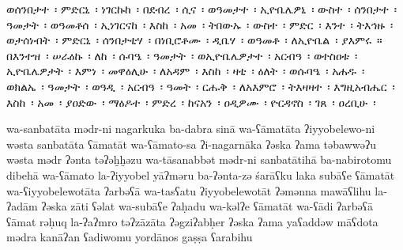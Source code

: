 
\begin{ethiopictext}
    ወሰንበታተ~፡ ምድርኒ~፡ ነገርኩከ~፡ በደብረ~፡ ሲና~፡ ወዓመታተ~፡
    ኢዮቤሌዎኒ~፡ ውስተ~፡ ሰንበታተ~፡ ዓመታት~፡ ወዓመቶሰ~፡ ኢነገርናከ~፡
    እስከ~፡ አመ~፡ ትበውኡ~፡ ውስተ~፡ ምድር~፡ እንተ~፡ ትእኅዙ~፡
    ወታሰነብት~፡ ምድርኒ~፡ ሰንበታቲሃ~፡ በነቢሮቶሙ~፡ ዲቤሃ~፡ 
    ወዓመቶ~፡ ለኢዮቤል~፡ ያእምሩ~። 
    በእንተዝ~፡ ሠራዕኩ~፡ ለከ~፡ 
    ሱባዔ~፡ ዓመታት~፡ ወኢዮቤሌዎታተ~፡ አርብዓ~፡ ወተስዐቱ~፡ ኢዮቤሌዎታት~፡
    እምነ~፡ መዋዕሊሁ~፡ ለአዳም~፡ እስከ~፡ ዛቲ~፡ ዕለት~፡ ወሱባዔ~፡
    አሐዱ~፡ ወክልኤ~፡ ዓመታት~፡ ወዓዲ~፡ አርብዓ~፡ ዓመት~፡ 
    ርሑቅ~፡ ለአእምሮ~፡ ትእዛዛተ~፡ እግዚአብሔር~፡ እስከ~፡ አመ~፡ ያዐድው~፡
    ማዕዶተ~፡ ምድረ~፡ ከናአን~፡ ዐዲዎሙ~፡ ዮርዳኖስ~፡ ገጸ~፡ ዐረቢሁ~፡
\end{ethiopictext}
\begin{transliteration}
    wa-sanbatāta mədr-ni nagarkuka ba-dabra sinā wa-ʕāmatāta
    ʔiyyobelewo-ni wəsta sanbatāta ʕāmatāt wa-ʕāmato-sa ʔi-nagarnāka
    ʔəska ʔama təbawwəʔu wəsta mədr ʔənta təʔəḫḫəzu
    wa-tāsanabbət mədr-ni sanbatātihā ba-nabirotomu dibehā
    wa-ʕāmato la-ʔiyyobel yāʔməru
    ba-ʔənta-zə śarāʕku laka
    subāʕe ʕāmatāt wa-ʕiyyobelewotāta ʔarbəʕā wa-tasʕatu ʔiyyobelewotāt
    ʔəmənna mawāʕlihu la-ʔadām ʔəska zāti ʕəlat wa-subāʕe
    ʔaḥadu wa-kəlʔe ʕāmatāt wa-ʕādi ʔarbəʕā ʕāmat
    rəḥuq la-ʔaʔmro təʔzāzāta ʔəgziʔabḥer ʔəska ʔama yaʕaddəw
    māʕdota mədra kanāʔan ʕadiwomu yordānos gaṣṣa ʕarabihu

\end{transliteration}

